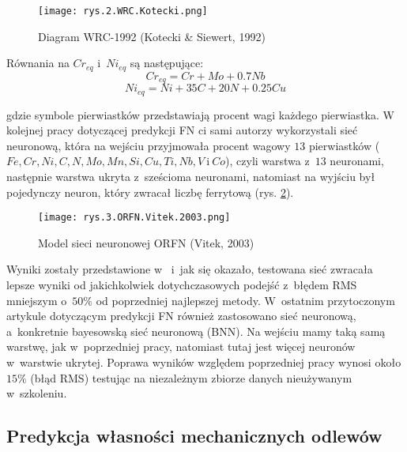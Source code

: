\begin{figure}[h]
    \centering
    \texttt{[image: rys.2.WRC.Kotecki.png]}
    \caption{Diagram WRC-1992 (Kotecki \& Siewert, 1992)}
    \label{fig:mesh2}
\end{figure}

Równania na  $Cr_{eq}$ i~$Ni_{eq}$ są następujące:
\begin{equation}
\label{eq1}
	Cr_{eq} = Cr + Mo + 0.7Nb
\end{equation}
\begin{equation}
\label{eq2}
	Ni_{eq} = Ni+35C+20N+0.25Cu
\end{equation}

\noindent gdzie symbole pierwiastków przedstawiają procent wagi każdego pierwiastka.
W kolejnej pracy \cite{Vitek03.I} dotyczącej predykcji FN ci sami autorzy wykorzystali sieć neuronową, która na wejściu przyjmowała procent wagowy $13$ pierwiastków ($Fe, Cr, Ni, C, N, Mo, Mn, Si, Cu, Ti, Nb, V~$i$~Co$), czyli warstwa z~$13$ neuronami, następnie warstwa ukryta z~sześcioma neuronami, natomiast na wyjściu był pojedynczy neuron, który zwracał liczbę ferrytową (rys. \ref{fig:mesh3}).

\begin{figure}[h]
    \centering
    \texttt{[image: rys.3.ORFN.Vitek.2003.png]}
    \caption{Model sieci neuronowej ORFN (Vitek, 2003)}
    \label{fig:mesh3}
\end{figure}

Wyniki zostały przedstawione w~\cite{Vitek03.II} i~jak się okazało, testowana sieć zwracała lepsze wyniki od jakichkolwiek dotychczasowych podejść z~błędem RMS mniejszym o~$50\%$ od poprzedniej najlepszej metody. 
    W~ostatnim przytoczonym artykule dotyczącym predykcji FN \cite{Vasudevan13} również zastosowano sieć neuronową, a~konkretnie bayesowską sieć neuronową (BNN). Na wejściu mamy taką samą warstwę, jak w~poprzedniej pracy, natomiast tutaj jest więcej neuronów w~warstwie ukrytej. Poprawa wyników względem poprzedniej pracy wynosi około $15\%$ (błąd RMS) testując na niezależnym zbiorze danych nieużywanym w~szkoleniu.

\subsection{Predykcja własności mechanicznych odlewów}
\label{sub:predykcja.1}


